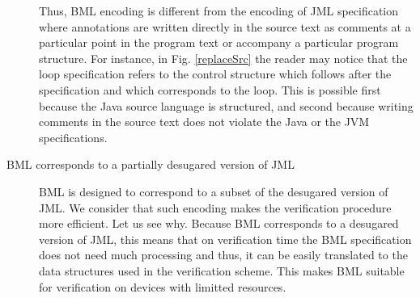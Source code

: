 \begin{description}
	    Thus, BML encoding is different from the encoding of   JML specification where
	    annotations are written directly in the source text as comments
	    at a particular point in the program text or accompany a particular program structure. 
	    For instance, in Fig. \ref{replaceSrc} the
	    reader may notice that the loop specification
	    refers to the control structure which follows after the specification and which corresponds to the loop.
	    This is possible first because
	    the Java source language is structured, and second because writing comments in the source text
	    does not violate the Java or the JVM  specifications. 
	  


\item [BML corresponds to a partially desugared version of JML]

      BML is designed to correspond to a subset of the desugared version of JML.
      We consider that such encoding makes the verification procedure more efficient. 
      Let us see why. Because BML corresponds to a desugared version of JML, this means that on verification time
      the BML specification does not need much processing and thus, it can be easily translated to the
      data structures used in the verification scheme. This makes BML suitable for verification on devices
      with limitted resources.
      

\end{description}
